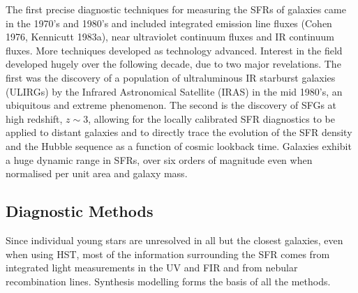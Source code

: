 \documentclass{literature}
\begin{document}
The first precise diagnostic techniques for measuring the SFRs of galaxies came in the 1970's and 1980's and included integrated emission line fluxes (Cohen 1976, Kennicutt 1983a), near ultraviolet continuum fluxes and IR continuum fluxes. More techniques developed as technology advanced. Interest in the field developed hugely over the following decade, due to two major revelations. The first was the discovery of a population of ultraluminous IR starburst galaxies (ULIRGs) by the Infrared Astronomical Satellite (IRAS) in the mid 1980's, an ubiquitous and extreme phenomenon. The second is the discovery of SFGs at high redshift, $z \sim 3$, allowing for the locally calibrated SFR diagnostics to be applied to distant galaxies and to directly trace the evolution of the SFR density and the Hubble sequence as a function of cosmic lookback time. Galaxies exhibit a huge dynamic range in SFRs, over six orders of magnitude even when normalised per unit area and galaxy mass.

\subsection{Diagnostic Methods}
Since individual young stars are unresolved in all but the closest galaxies, even when using HST, most of the information surrounding the SFR comes from integrated light measurements in the UV and FIR and from nebular recombination lines. Synthesis modelling forms the basis of all the methods. 
\end{document}
